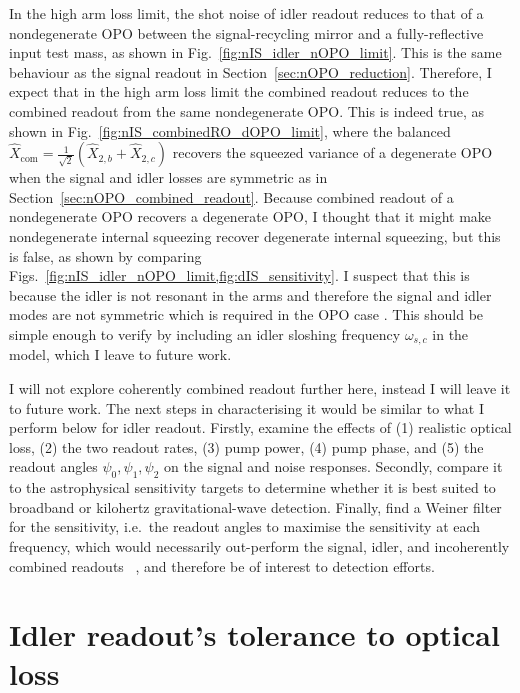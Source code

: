 In the high arm loss limit, the shot noise of idler readout reduces to that of a nondegenerate OPO between the signal-recycling mirror and a fully-reflective input test mass, as shown in Fig.~\ref{fig:nIS_idler_nOPO_limit}. This is the same behaviour as the signal readout in Section~\ref{sec:nOPO_reduction}.
Therefore, I expect that in the high arm loss limit the combined readout reduces to the combined readout from the same nondegenerate OPO. This is indeed true, as shown in Fig.~\ref{fig:nIS_combinedRO_dOPO_limit}, where the balanced $\hat X_\text{com}=\frac{1}{\sqrt2}\left(\hat X_{2,b}+\hat X_{2,c}\right)$  recovers the squeezed variance of a degenerate OPO when the signal and idler losses are symmetric  as in Section~\ref{sec:nOPO_combined_readout}.
Because combined readout of a nondegenerate OPO recovers a degenerate OPO, I thought that it might make nondegenerate internal squeezing recover degenerate internal squeezing, but this is false, as shown by comparing Figs.~\ref{fig:nIS_idler_nOPO_limit,fig:dIS_sensitivity}. I suspect that this is because the idler is not resonant in the arms and therefore the signal and idler modes are not symmetric which is required in the OPO case . This should be simple enough to verify by including an idler sloshing frequency $\omega_{s,c}$ in the model, which I leave to future work.

I will not explore coherently combined readout further here, instead I will leave it to future work. The next steps in characterising it would be similar to what I perform below for idler readout. Firstly, examine the effects of (1) realistic optical loss, (2) the two readout rates, (3) pump power, (4) pump phase, and (5) the readout angles $\psi_0,\psi_1,\psi_2$ on the signal and noise responses. %
Secondly, compare it to the astrophysical sensitivity targets to determine whether it is best suited to broadband or kilohertz gravitational-wave detection. Finally, find a Weiner filter for the sensitivity, i.e.\ the readout angles to maximise the sensitivity at each frequency, which would necessarily out-perform the signal, idler, and incoherently combined readouts ~\cite{}, and therefore be of interest to detection efforts.


\section{Idler readout's tolerance to optical loss}

